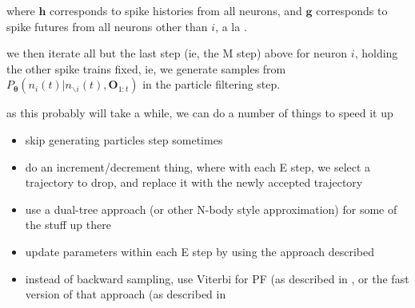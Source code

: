 \documentclass[12pt]{article}
\providecommand{\ve}[1]{\boldsymbol{#1}}
\providecommand{\ve}[1]{\boldsymbol{#1}}
\newcommand{\thetn}{\ve{\theta}}
\newcommand{\p}{P_{\thetn}}
\begin{document}
where $\ve{h}$ corresponds to spike histories from all neurons, and $\ve{g}$ corresponds to spike futures from all neurons other than $i$, a la \cite{PillowLatham07}.

we then iterate all but the last step (ie, the M step) above for neuron $i$, holding the other spike trains fixed, ie, we generate samples from $\p(n_i(t) | n_{\backslash i}(t), \ve{O}_{1:t})$ in the particle filtering step.

as this probably will take a while, we can do a number of things to speed it up

\begin{itemize}
\item skip generating particles step sometimes
\item do an increment/decrement thing, where with each E step, we select a trajectory to drop, and replace it with the newly accepted trajectory
\item use a dual-tree approach (or other N-body style approximation) for some of the stuff up there
\item update parameters within each E step by using the approach described \cite{NgDearden05}
\item instead of backward sampling, use Viterbi for PF (as described in \cite{GodsillDoucet01}, or the fast version of that approach (as described in \cite{KlaasFrietas05}
\end{itemize}
\end{document}
